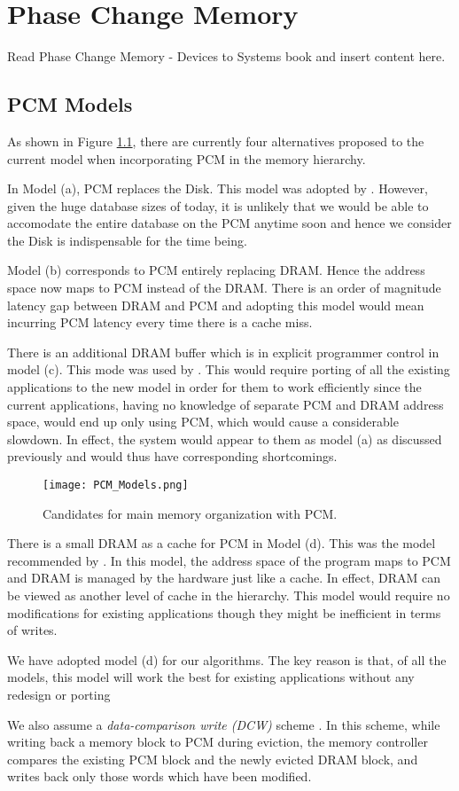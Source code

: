 \chapter{Phase Change Memory}
\label{pcm}

Read Phase Change Memory  - Devices to Systems book and insert content here.

\section{PCM Models}
As shown in Figure \ref{fig:sys_model}, there are currently four alternatives proposed to the current model when incorporating PCM in the memory hierarchy.

In Model (a), PCM replaces the Disk. This model was adopted by \cite{viglas}. However, given the huge database sizes of today, it is unlikely that we would be able to accomodate the entire database on the PCM anytime soon and hence we consider the Disk is indispensable for the time being. 


Model (b) corresponds to PCM entirely replacing DRAM. Hence the address space now maps to PCM instead of the DRAM. There is an order of magnitude latency gap between DRAM and PCM and adopting this model would mean incurring PCM latency every time there is a cache miss.

There is an additional DRAM buffer which is in explicit programmer control in model (c). This mode was used by \cite{vamsi}. This would require porting of all the existing applications to the new model in order for them to work efficiently since the current applications, having no knowledge of separate PCM and DRAM address space, would end up only using PCM, which would cause a considerable slowdown. In effect, the system would appear to them as model (a) as discussed previously and would thus have corresponding shortcomings.

\begin{figure}[h!]

\texttt{[image: PCM\_Models.png]}\centering
\caption{Candidates for main memory organization with PCM.}
\label{fig:sys_model}
\end{figure}

There is a small DRAM as a cache for PCM in Model (d). This was the model recommended by \cite{qureshi}. In this model, the address space of the program maps to PCM and DRAM is managed by the hardware just like a cache. In effect, DRAM can be viewed as another level of cache in the hierarchy. This model would require no modifications for existing applications though they might be inefficient in terms of writes. 

We have adopted model (d) for our algorithms. The key reason is that, of all the models, this model will work the best for existing applications without any redesign or porting    

We also assume a \textit{data-comparison write (DCW)} scheme \cite{write}. In this scheme, while writing back a memory block to PCM during eviction, the memory controller compares the existing PCM block and the newly evicted DRAM block, and writes back only those words which have been modified.